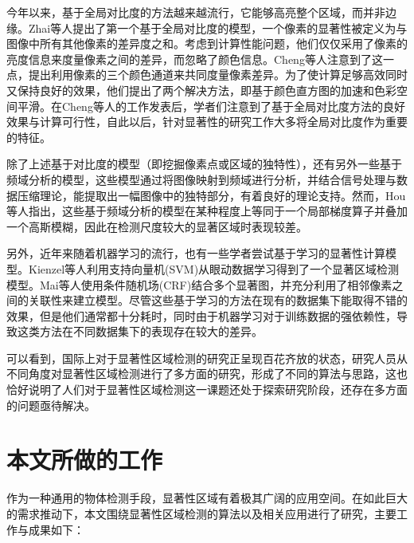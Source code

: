今年以来，基于全局对比度的方法越来越流行，它能够高亮整个区域，而并非边缘。Zhai等人\cite{zhai2006visual}提出了第一个基于全局对比度的模型，一个像素的显著性被定义为与图像中所有其他像素的差异度之和。考虑到计算性能问题，他们仅仅采用了像素的亮度信息来度量像素之间的差异，而忽略了颜色信息。Cheng等人\cite{cheng2011global}注意到了这一点，提出利用像素的三个颜色通道来共同度量像素差异。为了使计算足够高效同时又保持良好的效果，他们提出了两个解决方法，即基于颜色直方图的加速和色彩空间平滑。在Cheng等人的工作发表后，学者们注意到了基于全局对比度方法的良好效果与计算可行性，自此以后，针对显著性的研究工作大多将全局对比度作为重要的特征。

除了上述基于对比度的模型（即挖掘像素点或区域的独特性），还有另外一些基于频域分析的模型\cite{achanta2009frequency}\cite{hou2007saliency}\cite{hou2012image}，这些模型通过将图像映射到频域进行分析，并结合信号处理与数据压缩理论，能提取出一幅图像中的独特部分，有着良好的理论支持。然而，Hou等人\cite{hou2012image}指出，这些基于频域分析的模型在某种程度上等同于一个局部梯度算子并叠加一个高斯模糊，因此在检测尺度较大的显著区域时表现较差。

另外，近年来随着机器学习的流行，也有一些学者尝试基于学习的显著性计算模型。Kienzel等人\cite{kienzle2007nonparametric}利用支持向量机(SVM)从眼动数据学习得到了一个显著区域检测模型。Mai等人\cite{maisaliency}使用条件随机场(CRF)结合多个显著图，并充分利用了相邻像素之间的关联性来建立模型。尽管这些基于学习的方法在现有的数据集下能取得不错的效果，但是他们通常都十分耗时，同时由于机器学习对于训练数据的强依赖性，导致这类方法在不同数据集下的表现存在较大的差异。

可以看到，国际上对于显著性区域检测的研究正呈现百花齐放的状态，研究人员从不同角度对显著性区域检测进行了多方面的研究，形成了不同的算法与思路，这也恰好说明了人们对于显著性区域检测这一课题还处于探索研究阶段，还存在多方面的问题亟待解决。

\section{本文所做的工作}
作为一种通用的物体检测手段，显著性区域有着极其广阔的应用空间\cite{tsai2012hierarchical}\cite{fang2012effective}\cite{deigmoeller2010context}\cite{jiang2011automatic}。在如此巨大的需求推动下，本文围绕显著性区域检测的算法以及相关应用进行了研究，主要工作与成果如下：

